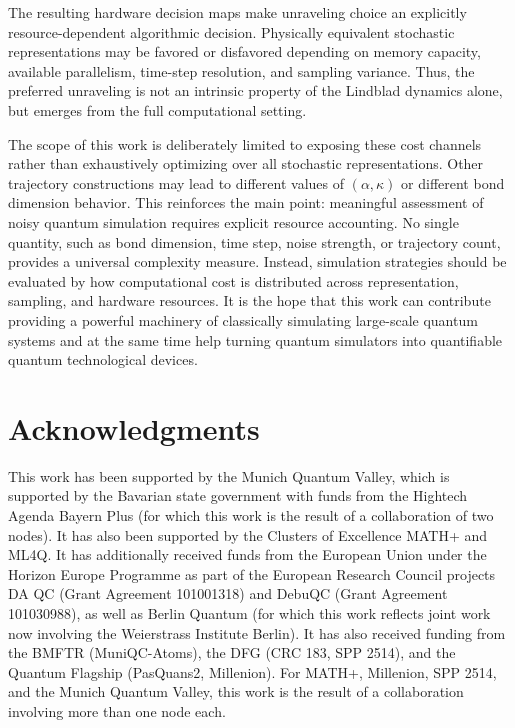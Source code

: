\documentclass[aps, pra, superscriptaddress, reprint, floatfix]{revtex4-2}
\theoremstyle{plain}
\begin{document}
The resulting hardware decision maps make unraveling choice an explicitly resource-dependent algorithmic decision. Physically equivalent stochastic representations may be favored or disfavored depending on memory capacity, available parallelism, time-step resolution, and sampling variance. Thus, the preferred unraveling is not an intrinsic property of the Lindblad dynamics alone, but emerges from the full computational setting.

The scope of this work is deliberately limited to exposing these cost channels rather than exhaustively optimizing over all stochastic representations. Other trajectory constructions may lead to different values of $(\alpha,\kappa)$ or different bond dimension behavior. This reinforces the main point: meaningful assessment of noisy quantum simulation requires explicit resource accounting. No single quantity, such as bond dimension, time step, noise strength, or trajectory count, provides a universal complexity measure. Instead, simulation strategies should be evaluated by how computational cost is distributed across representation, sampling, and hardware resources.
It is the 
hope that this work can contribute providing a powerful machinery of classically simulating large-scale quantum systems and at the same time help turning quantum simulators into quantifiable quantum technological devices.

\section*{Acknowledgments}
This work has been supported by the Munich Quantum Valley, which is supported by the Bavarian state government with funds from the Hightech Agenda Bayern Plus (for which this work is the result of a collaboration 
of two nodes). It has also been supported by the Clusters of Excellence MATH+ 
and ML4Q. It has additionally received funds from
the European Union under the Horizon Europe Programme as part of the European Research Council projects DA QC (Grant Agreement 101001318) and DebuQC (Grant Agreement 101030988),
as well as Berlin Quantum (for which this work reflects joint work now involving the Weierstrass Institute Berlin). It has also received funding from the BMFTR (MuniQC-Atoms), the DFG (CRC 183, SPP 2514), and the Quantum Flagship (PasQuans2, Millenion). For MATH+, Millenion, SPP 2514, and the Munich Quantum Valley, this work is the result of a collaboration involving more than one node each.



\end{document}
